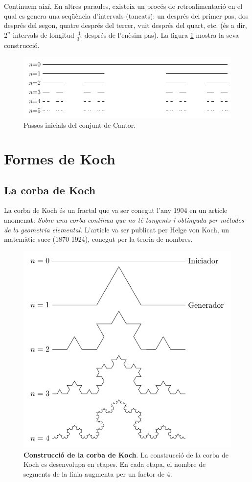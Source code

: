 \documentclass[12pt,a4paper]{report}
\begin{document}
Continuem així. En altres paraules, existeix un procés de retroalimentació en el qual es genera una seqüència d'intervals (tancats): un després del primer pas, dos després del segon, quatre després del tercer, vuit després del quart, etc. (és a dir, $2^n$ intervals de longitud $\displaystyle\frac{1}{3^n}$ després de l'enèsim pas). La figura \ref{img03_04} mostra la seva construcció.

\begin{figure}[!ht]
\centering
\includegraphics[scale=1]{img/img03_04_cantor.pdf}
\caption{Passos inicials del conjunt de Cantor.}
\label{img03_04}
\end{figure}
\section{Formes de Koch}
\subsection{La corba de Koch}
La corba de Koch \cite{Lopez:koch} és un fractal que va ser conegut l'any 1904 en un article anomenat: \emph{Sobre una corba continua que no té tangents i obtinguda per mètodes de la geometria elemental}.  L'article va ser publicat per Helge von Koch, un matemàtic suec (1870-1924), conegut per la teoria de nombres.  
\begin{figure}[!ht]
\centering
\includegraphics[scale=1]{img/img03_05_koch.pdf}
\caption{\textbf{Construcció de la corba de Koch}. La construcció de la corba de Koch es desenvolupa en etapes. En cada etapa, el nombre de segments de la línia augmenta per un factor de 4.}
\label{img03_05}
\end{figure}
\end{document}
